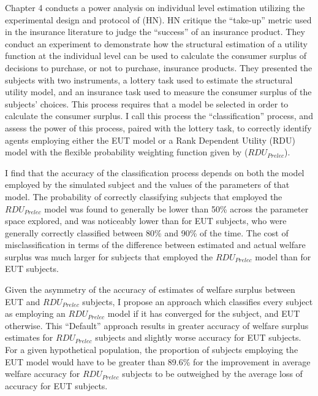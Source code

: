 \documentclass[../main.tex]{subfiles}
\begin{document}
Chapter 4 conducts a power analysis on individual level estimation utilizing the experimental design and protocol of \textcite{Harrison2016} (HN).
HN critique the \enquote{take-up} metric used in the insurance literature to judge the \enquote{success} of an insurance product.
They conduct an experiment to demonstrate how the structural estimation of a utility function at the individual level can be used to calculate the consumer surplus of decisions to purchase, or not to purchase, insurance products.
They presented the subjects with two instruments, a lottery task used to estimate the structural utility model, and an insurance task used to measure the consumer surplus of the subjects' choices.
This process requires that a model be selected in order to calculate the consumer surplus.
I call this process the \enquote{classification} process, and assess the power of this process, paired with the lottery task, to correctly identify agents employing either the EUT model or a Rank Dependent Utility (RDU) model with the flexible probability weighting function given by \textcite{Prelec1998} ($\mathit{RDU_{Prelec}}$).

I find that the accuracy of the classification process depends on both the model employed by the simulated subject and the values of the parameters of that model.
The probability of correctly classifying subjects that employed the $\mathit{RDU_{Prelec}}$ model was found to generally be lower than 50\% across the parameter space explored, and was noticeably lower than for EUT subjects, who were generally correctly classified between 80\% and 90\% of the time.
The cost of misclassification in terms of the difference between estimated and actual welfare surplus was much larger for subjects that employed the $\mathit{RDU_{Prelec}}$ model than for EUT subjects.

Given the asymmetry of the accuracy of estimates of welfare surplus between EUT and $\mathit{RDU_{Prelec}}$ subjects, I propose an approach which classifies every subject as employing an $\mathit{RDU_{Prelec}}$ model if it has converged for the subject, and EUT otherwise.
This \enquote{Default} approach results in greater accuracy of welfare surplus estimates for $\mathit{RDU_{Prelec}}$ subjects and slightly worse accuracy for EUT subjects.
For a given hypothetical population, the proportion of subjects employing the EUT model would have to be greater than 89.6\% for the improvement in average welfare accuracy for $\mathit{RDU_{Prelec}}$ subjects to be outweighed by the average loss of accuracy for EUT subjects.
\end{document}
